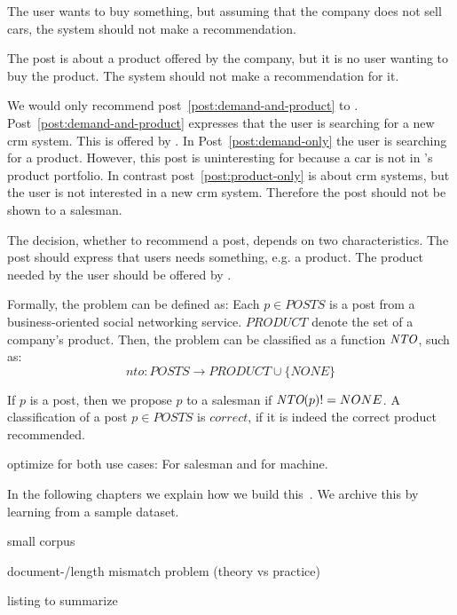 \begin{post}
	\centering
	\caption{The user wants to buy something, but assuming that the company does not sell cars, the system should not make a recommendation.}
	\label{post:demand-only}
\end{post}

\begin{post}
	\centering
	\caption{The post is about a product offered by the company, but it is no user wanting to buy the product. The system should not make a recommendation for it.}
	\label{post:product-only}
\end{post}

We would only recommend post~\ref{post:demand-and-product} to \acme.
Post~\ref{post:demand-and-product} expresses that the user is searching for a new crm system.
This is offered by \acme.
In Post~\ref{post:demand-only} the user is searching for a product. 
However, this post is uninteresting for \acme because a car is not in \acme's product portfolio. 
In contrast post~\ref{post:product-only} is about crm systems, but the user is not interested in a new crm system.
Therefore the post should not be shown to a salesman.

The decision, whether to recommend a post, depends on two characteristics.
The post should express that users needs something, e.g. a product.
The product needed by the user should be offered by \acme.


Formally, the problem can be defined as: 
Each $p \in POSTS$ is a post from a business-oriented social networking service. $PRODUCT$ denote the set of a company's product.
Then, the problem can be classified as a function $\emph{NTO}$, such as:
\begin{displaymath}
	nto: POSTS \to PRODUCT \cup \{NONE\}
\end{displaymath}

If $p$ is a post, then we propose $p$ to a salesman if $\emph{NTO}(p) != NONE$.
A classification of a post $p \in POSTS$ is $correct$, if it is indeed the correct product recommended.

optimize for both use cases: For salesman and for machine.

In the following chapters we explain how we build this~\nto.
We archive this by learning from a sample dataset. 

small corpus

document-/length mismatch problem (theory vs practice)

listing to summarize


